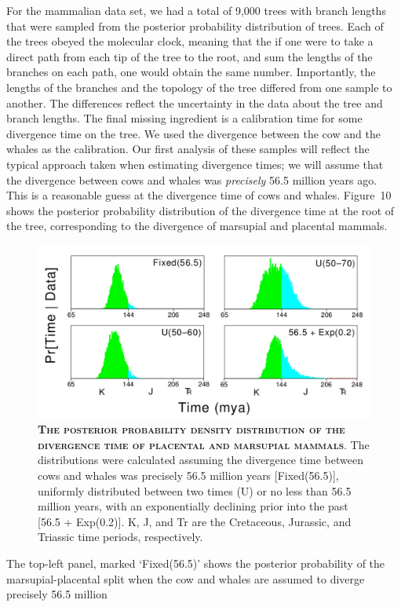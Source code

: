 \documentclass{svmult}
\begin{document}
For the mammalian data set, we had a total of 9,000 trees with branch lengths that were sampled from the posterior probability distribution of trees. Each of the trees obeyed
the molecular clock, meaning that the if one were to take a direct path from each tip of the tree to the root, and sum the lengths of the branches on each path, one would
obtain the same number. Importantly, the lengths of the branches and the topology of the tree differed from one sample to another. The differences reflect the uncertainty
in the data about the tree and branch lengths. The final missing ingredient is a calibration time for some divergence time on the tree. We used the divergence between
the cow and the whales as the calibration. Our first analysis of these samples will reflect the typical approach taken when estimating divergence times; we will assume
that the divergence between cows and whales was {\it precisely} 56.5 million years ago. This is a reasonable guess at the divergence time of cows and whales. Figure~10
shows the posterior probability distribution of the divergence time at the root of the tree, corresponding to the divergence of marsupial and placental mammals. 
\begin{figure}[t]
\centering
\includegraphics[height=2.3in]{fig10}
\caption{\textbf{\textsc{The posterior probability density distribution of the divergence time of placental and marsupial mammals}}.
The distributions were calculated assuming the divergence time between cows and whales was precisely 56.5 million years [Fixed(56.5)], uniformly
distributed between two times (U) or no less than 56.5 million years, with an exponentially declining prior into the past [56.5 + Exp(0.2)]. K, J, and Tr are the Cretaceous,
Jurassic, and Triassic time periods, respectively.}
\label{fig10}
\end{figure}
The top-left panel, marked `Fixed(56.5)' shows the posterior probability of the marsupial-placental split when the cow and whales are assumed to diverge precisely 56.5 million
\end{document}
